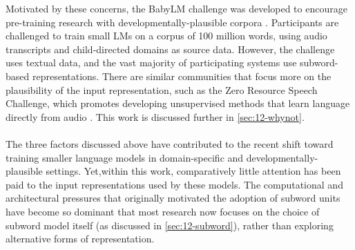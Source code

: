 
Motivated by these concerns, the BabyLM challenge was developed to encourage pre-training research with developmentally-plausible corpora \citep{warstadt2023findings}. Participants are challenged to train small LMs on a corpus of 100 million words, using audio transcripts and child-directed domains as source data. However, the challenge uses textual data, and the vast majority of participating systems use subword-based representations. There are similar communities that focus more on the plausibility of the input representation, such as the Zero Resource Speech Challenge, which promotes developing unsupervised methods that learn language directly from audio \citep{dunbar_self-supervised_2022}. This work is discussed further in \cref{sec:12-whynot}.

\paragraph{} The three factors discussed above have contributed to the recent shift toward training smaller language models in domain-specific and developmentally-plausible settings. Yet,within this work, comparatively little attention has been paid to the input representations used by these models. The computational and architectural pressures that originally motivated the adoption of subword units have become so dominant that most research now focuses on the choice of subword model itself (as discussed in \cref{sec:12-subword}), rather than exploring alternative forms of representation.

